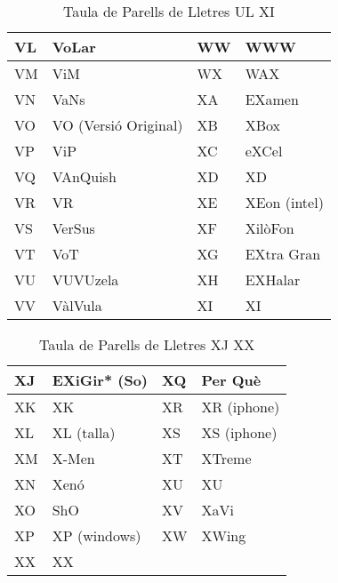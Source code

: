 \begin{table}[h]
\begin{tabular}{|l|l|l|l|}
    VL & VoLar                & WW & WWW               \\ \hline
    VM & ViM                  & WX & WAX               \\ \hline
    VN & VaNs                 & XA & EXamen            \\ \hline
    VO & VO (Versió Original) & XB & XBox              \\ \hline
    VP & ViP                  & XC & eXCel             \\ \hline
    VQ & VAnQuish             & XD & XD                \\ \hline
    VR & VR                   & XE & XEon (intel)      \\ \hline
    VS & VerSus               & XF & XilòFon           \\ \hline
    VT & VoT                  & XG & EXtra Gran        \\ \hline
    VU & VUVUzela             & XH & EXHalar           \\ \hline
    VV & VàlVula              & XI & XI                \\ \hline
    \end{tabular}
    \caption{Taula de Parells de Lletres UL \rightarrow XI}
    \label{tla:lletres-8}
    \end{table}  

\begin{table}[h]
    \centering
    \begin{tabular}{|l|l|l|l|}
    \hline
    XJ & EXiGir* (So) & XQ & Per Què     \\ \hline
    XK & XK           & XR & XR (iphone) \\ \hline
    XL & XL (talla)   & XS & XS (iphone) \\ \hline
    XM & X-Men        & XT & XTreme      \\ \hline
    XN & Xenó         & XU & XU          \\ \hline
    XO & ShO          & XV & XaVi        \\ \hline
    XP & XP (windows) & XW & XWing       \\ \hline
    XX   & XX              &  &          \\ \hline
    \end{tabular}
    \caption{Taula de Parells de Lletres XJ \rightarrow XX}
    \label{tla:lletres-9}
    \end{table}




